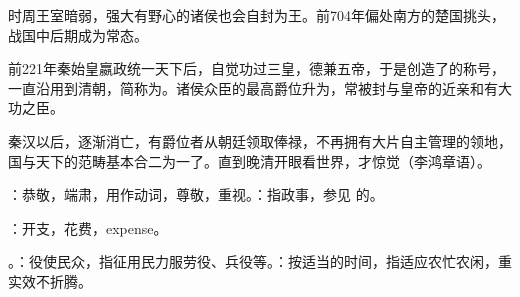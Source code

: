 {{\begin{lyenumerate}
时周王室暗弱，强大有野心的诸侯也会自封为王。前704年偏处南方的楚国挑头，战国中后期成为常态。

\item {}前221年秦始皇嬴政统一天下后，自觉功过三皇，德兼五帝，于是创造了的称号，一直沿用到清朝，简称为。诸侯众臣的最高爵位升为，常被封与皇帝的近亲和有大功之臣。

秦汉以后，逐渐消亡，有爵位者从朝廷领取俸禄，不再拥有大片自主管理的领地，国与天下的范畴基本合二为一了。直到晚清开眼看世界，才惊觉（李鸿章语）。
\end{lyenumerate}
}

\item {}：恭敬，端肃，用作动词，尊敬，重视。：指政事，参见  的。

\item {}：开支，花费，expense。

\item {}。：役使民众，指征用民力服劳役、兵役等。：按适当的时间，指适应农忙农闲，重实效不折腾。
}
{}


